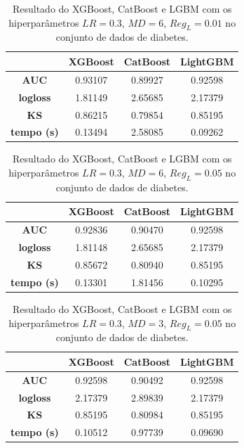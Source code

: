 \begin{table}[H]
\label{res:dia:6}
\centering
\begin{tabular}{|c|c|c|c|}
\hline
	& \textbf{XGBoost} &\textbf{CatBoost} & \textbf{LightGBM} \\
\hline
\textbf{AUC}	& 0.93107&	0.89927	&0.92598\\
\hline
\textbf{logloss}	& 1.81149	&2.65685	&2.17379\\
\hline
\textbf{KS}	& 0.86215	&0.79854	&0.85195 \\
\hline
\textbf{tempo (s)}	& 0.13494	&2.58085	&0.09262 \\
\hline
\end{tabular}
\caption{Resultado do XGBoost, CatBoost e LGBM com os hiperparâmetros $LR=0.3$, $MD=6$, $Reg_L=0.01$ no conjunto de dados de diabetes.}
\end{table}

\begin{table}[H]
\label{res:dia:7}
\centering
\begin{tabular}{|c|c|c|c|}
\hline
	& \textbf{XGBoost} &\textbf{CatBoost} & \textbf{LightGBM} \\
\hline
\textbf{AUC}	& 0.92836	&0.90470	&0.92598\\
\hline
\textbf{logloss}	& 1.81148&	2.65685&	2.17379\\
\hline
\textbf{KS}	&0.85672&	0.80940	&0.85195\\
\hline
\textbf{tempo (s)}	& 0.13301	&1.81456	&0.10295 \\
\hline
\end{tabular}
\caption{Resultado do XGBoost, CatBoost e LGBM com os hiperparâmetros $LR=0.3$, $MD=6$, $Reg_L=0.05$ no conjunto de dados de diabetes.}
\end{table}

\begin{table}[H]
\label{res:dia:8}
\centering
\begin{tabular}{|c|c|c|c|}
\hline
	& \textbf{XGBoost} &\textbf{CatBoost} & \textbf{LightGBM} \\
\hline
\textbf{AUC}	& 0.92598&	0.90492&	0.92598\\
\hline
\textbf{logloss}	& 2.17379&	2.89839	&2.17379\\
\hline
\textbf{KS}	& 0.85195	&0.80984	&0.85195 \\
\hline
\textbf{tempo (s)}	& 0.10512&	0.97739	&0.09690 \\
\hline
\end{tabular}
\caption{Resultado do XGBoost, CatBoost e LGBM com os hiperparâmetros $LR=0.3$, $MD=3$, $Reg_L=0.05$ no conjunto de dados de diabetes.}
\end{table}
